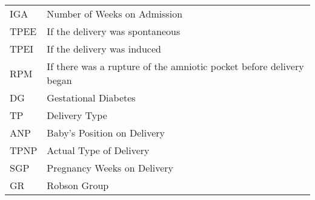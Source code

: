 \begin{table}[H]
\begin{tabularx}{\textwidth}{| l  | X |}
IGA  & Number of Weeks on Admission \\
TPEE  & If the delivery was spontaneous   \\
TPEI  &  If the delivery was induced  \\
RPM  & If there was a rupture of the amniotic pocket before delivery began \\
DG &  Gestational Diabetes \\
TP & Delivery Type \\
ANP  & Baby's Position on Delivery \\
TPNP  & Actual Type of Delivery\\
SGP  & Pregnancy Weeks on Delivery \\
GR  &   Robson Group \\
\bottomrule
\end{tabularx}
\end{table}